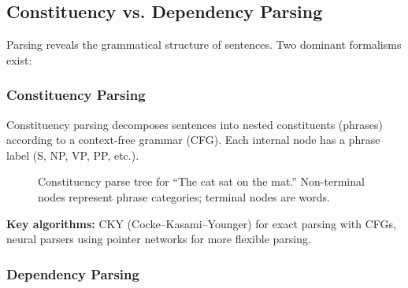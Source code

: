 \subsection{Constituency vs. Dependency Parsing}
\label{sec:parsing}

Parsing reveals the grammatical structure of sentences. Two dominant formalisms exist:

\subsubsection{Constituency Parsing}

Constituency parsing decomposes sentences into nested constituents (phrases) according to a
context-free grammar (CFG). Each internal node has a phrase label (S, NP, VP, PP, etc.).

\begin{figure}[H]
\centering
{}
\caption{Constituency parse tree for ``The cat sat on the mat.'' Non-terminal nodes
represent phrase categories; terminal nodes are words.}
\label{fig:constituency_parse}
\end{figure}

\textbf{Key algorithms:} CKY (Cocke--Kasami--Younger) for exact parsing with CFGs,
neural parsers using pointer networks for more flexible parsing.

\subsubsection{Dependency Parsing}

